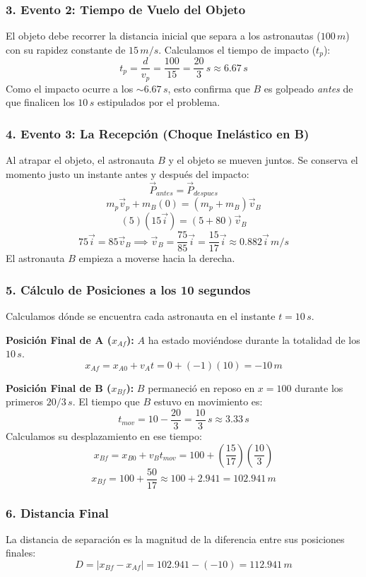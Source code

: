 \documentclass[12pt, a4paper]{article}
\begin{document}
\subsubsection*{3. Evento 2: Tiempo de Vuelo del Objeto}
El objeto debe recorrer la distancia inicial que separa a los astronautas ($100 \, \si{m}$) con su rapidez constante de $15 \, \si{m/s}$. Calculamos el tiempo de impacto ($t_p$):
\[ t_p = \frac{d}{v_p} = \frac{100}{15} = \frac{20}{3} \, \si{s} \approx 6.67 \, \si{s} \]
Como el impacto ocurre a los $\sim 6.67 \, \si{s}$, esto confirma que $B$ es golpeado \textit{antes} de que finalicen los $10 \, \si{s}$ estipulados por el problema.

\subsubsection*{4. Evento 3: La Recepción (Choque Inelástico en B)}
Al atrapar el objeto, el astronauta $B$ y el objeto se mueven juntos. Se conserva el momento justo un instante antes y después del impacto:
\[ \vec{P}_{antes} = \vec{P}_{despues} \]
\[ m_p \vec{v}_p + m_B(0) = (m_p + m_B) \vec{v}_B \]
\[ (5)(15 \vec{i}) = (5 + 80) \vec{v}_B \]
\[ 75 \vec{i} = 85 \vec{v}_B \implies \vec{v}_B = \frac{75}{85} \vec{i} = \frac{15}{17} \vec{i} \approx 0.882 \vec{i} \, \si{m/s} \]
El astronauta $B$ empieza a moverse hacia la derecha.

\subsubsection*{5. Cálculo de Posiciones a los 10 segundos}
Calculamos dónde se encuentra cada astronauta en el instante $t = 10 \, \si{s}$.

\textbf{Posición Final de A ($x_{Af}$):}
$A$ ha estado moviéndose durante la totalidad de los $10 \, \si{s}$.
\[ x_{Af} = x_{A0} + v_A t = 0 + (-1)(10) = -10 \, \si{m} \]

\textbf{Posición Final de B ($x_{Bf}$):}
$B$ permaneció en reposo en $x = 100$ durante los primeros $20/3 \, \si{s}$. El tiempo que $B$ estuvo en movimiento es:
\[ t_{mov} = 10 - \frac{20}{3} = \frac{10}{3} \, \si{s} \approx 3.33 \, \si{s} \]
Calculamos su desplazamiento en ese tiempo:
\[ x_{Bf} = x_{B0} + v_B t_{mov} = 100 + \left(\frac{15}{17}\right) \left(\frac{10}{3}\right) \]
\[ x_{Bf} = 100 + \frac{50}{17} \approx 100 + 2.941 = 102.941 \, \si{m} \]

\subsubsection*{6. Distancia Final}
La distancia de separación es la magnitud de la diferencia entre sus posiciones finales:
\[ D = |x_{Bf} - x_{Af}| = 102.941 - (-10) = 112.941 \, \si{m} \]
\end{document}
